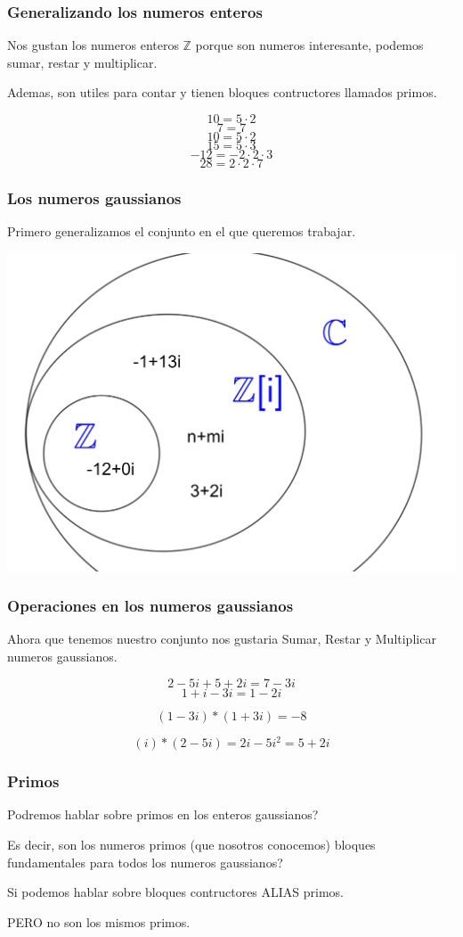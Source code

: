 \documentclass{beamer}
\theoremstyle{thmstyle}
\theoremstyle{thmstyle}
\theoremstyle{thmstyle}
\theoremstyle{mystyle}
\theoremstyle{qstnstyle}
\begin{document}
\begin{frame}
\frametitle{Generalizando los numeros enteros}

Nos gustan los numeros enteros $\mathbb{Z}$ porque son numeros interesante, podemos sumar, restar y multiplicar.

\pause
Ademas, son utiles para contar y tienen bloques contructores llamados primos.


\vspace{5mm}

$$10=5\cdot 2 $$
$$7=7 $$
$$10=5\cdot 2 $$
$$15=5\cdot 3 $$
$$-12=-2\cdot 2 \cdot 3 $$
$$28=2\cdot 2 \cdot 7 $$
\end{frame}

\begin{frame}
\frametitle{Los numeros gaussianos}
Primero generalizamos el conjunto en el que queremos trabajar.

\begin{center}
\includegraphics[width=0.8\linewidth]{Image8.png}
\end{center}

\end{frame}


\begin{frame}
\frametitle{Operaciones en los numeros gaussianos}
Ahora que tenemos nuestro conjunto nos gustaria Sumar, Restar y Multiplicar numeros gaussianos.

$$2-5i+5+2i=7-3i $$
\pause
$$1+i-3i=1-2i $$

\pause
$$(1-3i)*(1+3i)=-8 $$

\pause
$$(i)*(2-5i)=2i-5i^2=5+2i $$

\end{frame}

\begin{frame}
\frametitle{Primos}
Podremos hablar sobre primos en los enteros gaussianos? 

\pause
\vspace{10mm}
 Es decir, son los numeros primos (que nosotros conocemos) bloques fundamentales para todos los numeros gaussianos?

\pause
\vspace{10mm}
Si podemos hablar sobre bloques contructores ALIAS primos. 

\pause PERO no son los mismos primos.
\end{frame}
\end{document}
